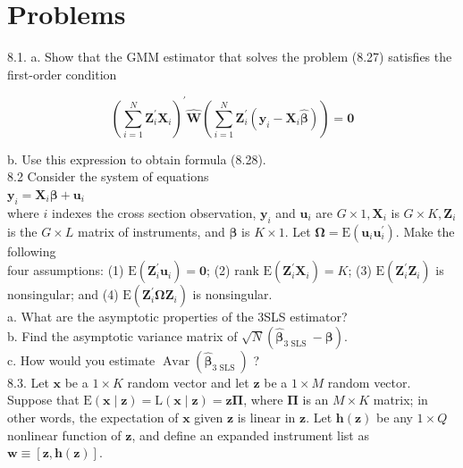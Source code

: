 \documentclass[10pt]{article}
\begin{document}
\section*{Problems}
8.1. a. Show that the GMM estimator that solves the problem (8.27) satisfies the first-order condition

$$
\left(\sum_{i=1}^{N} \mathbf{Z}_{i}^{\prime} \mathbf{X}_{i}\right)^{\prime} \hat{\mathbf{W}}\left(\sum_{i=1}^{N} \mathbf{Z}_{i}^{\prime}\left(\mathbf{y}_{i}-\mathbf{X}_{i} \hat{\boldsymbol{\beta}}\right)\right)=\mathbf{0}
$$

b. Use this expression to obtain formula (8.28).\\
8.2 Consider the system of equations\\
$\mathbf{y}_{i}=\mathbf{X}_{i} \boldsymbol{\beta}+\mathbf{u}_{i}$\\
where $i$ indexes the cross section observation, $\mathbf{y}_{i}$ and $\mathbf{u}_{i}$ are $G \times 1, \mathbf{X}_{i}$ is $G \times K, \mathbf{Z}_{i}$ is the $G \times L$ matrix of instruments, and $\boldsymbol{\beta}$ is $K \times 1$. Let $\boldsymbol{\Omega}=\mathrm{E}\left(\mathbf{u}_{i} \mathbf{u}_{i}^{\prime}\right)$. Make the following\\
four assumptions: (1) $\mathrm{E}\left(\mathbf{Z}_{i}^{\prime} \mathbf{u}_{i}\right)=\mathbf{0}$; (2) rank $\mathrm{E}\left(\mathbf{Z}_{i}^{\prime} \mathbf{X}_{i}\right)=K$; (3) $\mathrm{E}\left(\mathbf{Z}_{i}^{\prime} \mathbf{Z}_{i}\right)$ is nonsingular; and (4) $\mathrm{E}\left(\mathbf{Z}_{i}^{\prime} \boldsymbol{\Omega} \mathbf{Z}_{i}\right)$ is nonsingular.\\
a. What are the asymptotic properties of the 3SLS estimator?\\
b. Find the asymptotic variance matrix of $\sqrt{N}\left(\hat{\boldsymbol{\beta}}_{3 \text { SLS }}-\boldsymbol{\beta}\right)$.\\
c. How would you estimate $\operatorname{Avar}\left(\hat{\boldsymbol{\beta}}_{3 \text { SLS }}\right)$ ?\\
8.3. Let $\mathbf{x}$ be a $1 \times K$ random vector and let $\mathbf{z}$ be a $1 \times M$ random vector. Suppose that $\mathrm{E}(\mathbf{x} \mid \mathbf{z})=\mathrm{L}(\mathbf{x} \mid \mathbf{z})=\mathbf{z} \boldsymbol{\Pi}$, where $\boldsymbol{\Pi}$ is an $M \times K$ matrix; in other words, the expectation of $\mathbf{x}$ given $\mathbf{z}$ is linear in $\mathbf{z}$. Let $\mathbf{h}(\mathbf{z})$ be any $1 \times Q$ nonlinear function of $\mathbf{z}$, and define an expanded instrument list as $\mathbf{w} \equiv[\mathbf{z}, \mathbf{h}(\mathbf{z})]$.\\
\end{document}
